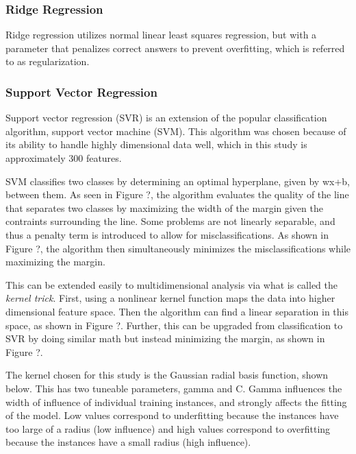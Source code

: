 \documentclass{anstrans}
\begin{document}
\subsubsection{Ridge Regression}


Ridge regression utilizes normal linear least squares regression, but with a
parameter that penalizes correct answers to prevent overfitting, which is
referred to as regularization. 

\subsubsection{Support Vector Regression}



Support vector regression (SVR) is an extension of the popular classification
algorithm, support vector machine (SVM).  This algorithm was chosen because of
its ability to handle highly dimensional data well, which in this study is
approximately 300 features. 

SVM classifies two classes by determining an optimal hyperplane, given by wx+b,
between them.  As seen in Figure ?, the algorithm evaluates the quality of the
line that separates two classes by maximizing the width of the margin given the
contraints surrounding the line.  Some problems are not linearly separable, and
thus a penalty term is introduced to allow for misclassifications. As shown in
Figure ?, the algorithm then simultaneously minimizes the misclassifications
while maximizing the margin. 

This can be extended easily to multidimensional analysis via what is called the
\textit{kernel trick}.  First, using a nonlinear kernel function maps the data
into higher dimensional feature space. Then the algorithm can find a linear
separation in this space, as shown in Figure ?. Further, this can be upgraded
from classification to SVR by doing similar math but instead minimizing the
margin, as shown in Figure ?. 

The kernel chosen for this study is the Gaussian radial basis function, shown
below. This has two tuneable parameters, gamma and C. Gamma influences the
width of influence of individual training instances, and strongly affects the
fitting of the model. Low values correspond to underfitting because the
instances have too large of a radius (low influence) and high values correspond
to overfitting because the instances have a small radius (high influence). 
\end{document}
